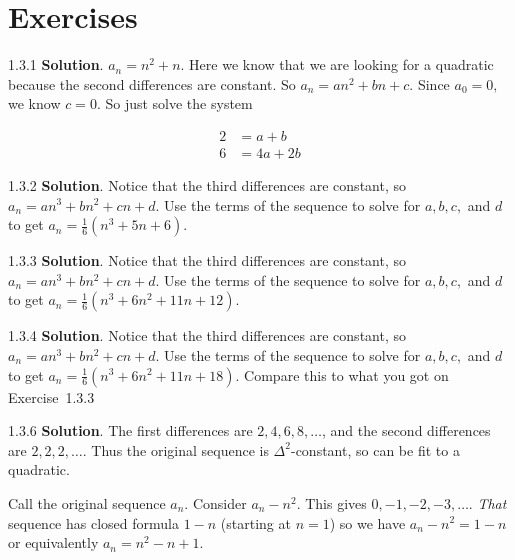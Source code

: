 \documentclass[11pt,]{book}
\theoremstyle{ptxplainnotitle}
\theoremstyle{ptxplaintitle}
\theoremstyle{ptxdefinitionnotitle}
\theoremstyle{ptxdefinitiontitle}
\theoremstyle{ptxdefinitionnotitle}
\theoremstyle{ptxdefinitiontitle}
\theoremstyle{ptxdefinitionnotitle}
\theoremstyle{ptxdefinitiontitle}
\theoremstyle{ptxdefinitiontitlenonumber}
\theoremstyle{ptxdefinitiontitlenonumber}
\numberwithin{equation}{chapter}
\newcommand{\amp}{&}
\begin{document}
\section*{Exercises}
\begin{divisionexercise}{1.3.1}
\textbf{Solution}.\quad%
\hypertarget{p-373}{}%
\(a_n = n^2 + n\text{.}\)  Here we know that we are looking for a quadratic because the second differences are constant.  So \(a_n = an^2 + bn + c\text{.}\)  Since \(a_0 = 0\text{,}\) we know \(c= 0\text{.}\)  So just solve the system%
\par
\hypertarget{p-374}{}%
%
\begin{equation*}
\begin{aligned}
2 \amp = a + b \\
6 \amp = 4a + 2b 
\end{aligned}
\end{equation*}
%
\end{divisionexercise}%
\begin{divisionexercise}{1.3.2}
\textbf{Solution}.\quad%
\hypertarget{p-379}{}%
Notice that the third differences are constant, so \(a_n = an^3 + bn^2 + cn + d\text{.}\) Use the terms of the sequence to solve for \(a, b, c,\) and \(d\) to get \(a_n = \frac{1}{6} (n^3 + 5n + 6)\text{.}\)%
\end{divisionexercise}%
\begin{divisionexercise}{1.3.3}
\textbf{Solution}.\quad%
\hypertarget{p-384}{}%
Notice that the third differences are constant, so \(a_n = an^3 + bn^2 + cn + d\text{.}\) Use the terms of the sequence to solve for \(a, b, c,\) and \(d\) to get \(a_n = \frac{1}{6} (n^3 + 6n^2 + 11n + 12)\text{.}\)%
\end{divisionexercise}%
\begin{divisionexercise}{1.3.4}
\textbf{Solution}.\quad%
\hypertarget{p-389}{}%
Notice that the third differences are constant, so \(a_n = an^3 + bn^2 + cn + d\text{.}\) Use the terms of the sequence to solve for \(a, b, c,\) and \(d\) to get \(a_n = \frac{1}{6} (n^3 + 6n^2 + 11n + 18)\text{.}\)  Compare this to what you got on Exercise~1.3.3%
\end{divisionexercise}%
\begin{divisionexercise}{1.3.6}
\textbf{Solution}.\quad%
\hypertarget{p-392}{}%
The first differences are \(2, 4, 6, 8, \ldots\), and the second differences are \(2, 2, 2, \ldots\). Thus the original sequence is \(\Delta^2\)-constant, so can be fit to a quadratic.%
\par
\hypertarget{p-393}{}%
Call the original sequence \(a_n\). Consider \(a_n - n^2\). This gives \(0, -1, -2, -3, \ldots\). \emph{That} sequence has closed formula \(1-n\) (starting at \(n = 1\)) so we have \(a_n - n^2 = 1-n\) or equivalently \(a_n = n^2 - n + 1\).%
\end{divisionexercise}%
\end{document}
